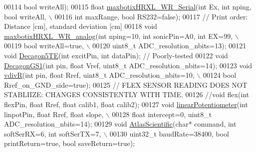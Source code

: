 \begin{DoxyCode}
00114          \textcolor{keywordtype}{bool} writeAll);
00115     \textcolor{keywordtype}{float} \hyperlink{classLogger_a87ce56cb9c3dfc7abfd6308b2ee7dc10}{maxbotixHRXL\_WR\_Serial}(\textcolor{keywordtype}{int} Ex, \textcolor{keywordtype}{int} nping, \textcolor{keywordtype}{bool} writeAll, \(\backslash\)
00116           \textcolor{keywordtype}{int} maxRange, \textcolor{keywordtype}{bool} RS232=\textcolor{keyword}{false});
00117     \textcolor{comment}{// Print order: Distance [cm], standard deviation [cm]}
00118     \textcolor{keywordtype}{void} \hyperlink{classLogger_aa05378a90963ceebf7dad0904a74f42f}{maxbotixHRXL\_WR\_analog}(\textcolor{keywordtype}{int} nping=10, \textcolor{keywordtype}{int} sonicPin=A0, \textcolor{keywordtype}{int} EX=99, \(\backslash\)
00119          \textcolor{keywordtype}{bool} writeAll=\textcolor{keyword}{true}, \(\backslash\)
00120          uint8\_t ADC\_resolution\_nbits=13);
00121     \textcolor{keywordtype}{void} \hyperlink{classLogger_a40ae372dee7f672a6d6f33ab441e4da1}{Decagon5TE}(\textcolor{keywordtype}{int} excitPin, \textcolor{keywordtype}{int} dataPin); \textcolor{comment}{// Poorly-tested}
00122     \textcolor{keywordtype}{void} \hyperlink{classLogger_a84da6a9ec3d4d56fdc32d950b71f1a26}{DecagonGS1}(\textcolor{keywordtype}{int} pin, \textcolor{keywordtype}{float} Vref, uint8\_t ADC\_resolution\_nbits=14);
00123     \textcolor{keywordtype}{void} \hyperlink{classLogger_ab1ae31b2bdb77c86fb6851907258171b}{vdivR}(\textcolor{keywordtype}{int} pin, \textcolor{keywordtype}{float} Rref, uint8\_t ADC\_resolution\_nbits=10, \(\backslash\)
00124          \textcolor{keywordtype}{bool} Rref\_on\_GND\_side=\textcolor{keyword}{true});
00125     \textcolor{comment}{// FLEX SENSOR READING DOES NOT STABLIIZE: CHANGES CONSISTENTLY WITH TIME.}
00126     \textcolor{comment}{//void flex(int flexPin, float Rref, float calib1, float calib2);}
00127     \textcolor{keywordtype}{void} \hyperlink{classLogger_a12dc18b7b16c91de5f7a3af7edb381a9}{linearPotentiometer}(\textcolor{keywordtype}{int} linpotPin, \textcolor{keywordtype}{float} Rref, \textcolor{keywordtype}{float} slope, \(\backslash\)
00128          \textcolor{keywordtype}{float} intercept=0, uint8\_t ADC\_resolution\_nbits=14);
00129     \textcolor{keywordtype}{void} \hyperlink{classLogger_a9fdcbb56e3e4910ac895ee150fe1b9ed}{AtlasScientific}(\textcolor{keywordtype}{char}* command, \textcolor{keywordtype}{int} softSerRX=6, \textcolor{keywordtype}{int} softSerTX=7, \(\backslash\)
00130          uint32\_t baudRate=38400, \textcolor{keywordtype}{bool} printReturn=\textcolor{keyword}{true}, \textcolor{keywordtype}{bool} saveReturn=\textcolor{keyword}{true});

\end{DoxyCode}
